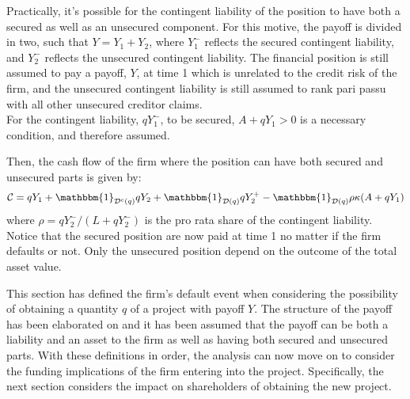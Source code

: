 \documentclass[main.tex]{subfiles}
\begin{document}
        Practically, it's possible for the contingent liability of the position
        to have both a secured as well as an unsecured component.
        For this motive, the payoff is divided in two, such that $Y=Y_1 + Y_2$, where $Y_1^{-}$ reflects the secured contingent liability, and $Y_2^{-}$ reflects the unsecured contingent liability.
        The financial position is still assumed to pay a payoff, $Y$, at time 1 which is unrelated to the credit risk of the firm, and the unsecured contingent liability is still assumed to rank pari passu with all other unsecured creditor claims.\\
        For the contingent liability, $qY_1^{-}$, to be secured, $A+qY_1 > 0$ is a necessary condition, and therefore assumed.

        Then, the cash flow of the firm where the position 
        can have both secured and unsecured parts is given by:
        \begin{equation*}
            \mathcal{C} =
                q Y_{1}
                + \mathbbm{1}_{\mathcal{D}^{c}(q)} qY_{2}
                + \mathbbm{1}_{\mathcal{D}(q)} qY_{2}^{+}
                - \mathbbm{1}_{\mathcal{D}(q)} \rho\kappa (A + qY_{1})
        \end{equation*}
        where $\rho = qY_{2}^{-}/(L + qY_{2}^{-})$ is the pro rata share of the contingent liability. 
        Notice that the secured position are now paid at time 1 no matter if the firm defaults or not. 
        Only the unsecured position depend on the outcome of the total asset value.

        This section has defined the firm's default event when considering the possibility
        of obtaining a quantity $q$ of a project with payoff $Y$.
        The structure of the payoff has been elaborated on
        and it has been assumed that the payoff can be both a liability and an asset to the firm
        as well as having both secured and unsecured parts.
        With these definitions in order, the analysis can now move on to consider the
        funding implications of the firm entering into the project.
        Specifically, the next section considers the impact on shareholders 
        of obtaining the new project.
        
\end{document}
